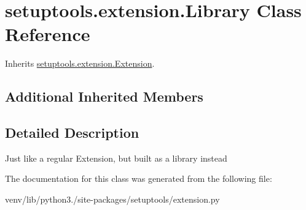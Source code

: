 \hypertarget{classsetuptools_1_1extension_1_1_library}{}\section{setuptools.\+extension.\+Library Class Reference}
\label{classsetuptools_1_1extension_1_1_library}


Inherits \hyperlink{classsetuptools_1_1extension_1_1_extension}{setuptools.\+extension.\+Extension}.

\subsection*{Additional Inherited Members}


\subsection{Detailed Description}
\begin{DoxyVerb}Just like a regular Extension, but built as a library instead\end{DoxyVerb}
 

The documentation for this class was generated from the following file\+:\begin{DoxyCompactItemize}
\item 
venv/lib/python3./site-\/packages/setuptools/extension.\+py\end{DoxyCompactItemize}
